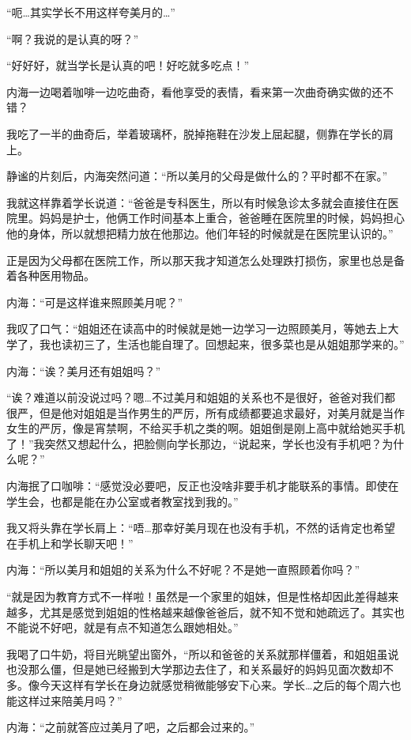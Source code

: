 “呃…其实学长不用这样夸美月的…”

“啊？我说的是认真的呀？”

“好好好，就当学长是认真的吧！好吃就多吃点！”

内海一边喝着咖啡一边吃曲奇，看他享受的表情，看来第一次曲奇确实做的还不错？

我吃了一半的曲奇后，举着玻璃杯，脱掉拖鞋在沙发上屈起腿，侧靠在学长的肩上。

静谧的片刻后，内海突然问道：“所以美月的父母是做什么的？平时都不在家。”

我就这样靠着学长说道：“爸爸是专科医生，所以有时候急诊太多就会直接住在医院里。妈妈是护士，他俩工作时间基本上重合，爸爸睡在医院里的时候，妈妈担心他的身体，所以就想把精力放在他那边。他们年轻的时候就是在医院里认识的。”

正是因为父母都在医院工作，所以那天我才知道怎么处理跌打损伤，家里也总是备着各种医用物品。

内海：“可是这样谁来照顾美月呢？”

我叹了口气：“姐姐还在读高中的时候就是她一边学习一边照顾美月，等她去上大学了，我也读初三了，生活也能自理了。回想起来，很多菜也是从姐姐那学来的。”

内海：“诶？美月还有姐姐吗？”

“诶？难道以前没说过吗？嗯…不过美月和姐姐的关系也不是很好，爸爸对我们都很严，但是他对姐姐是当作男生的严厉，所有成绩都要追求最好，对美月就是当作女生的严厉，像是宵禁啊，不给买手机之类的啊。姐姐倒是刚上高中就给她买手机了！”我突然又想起什么，把脸侧向学长那边，“说起来，学长也没有手机吧？为什么呢？”

内海抿了口咖啡：“感觉没必要吧，反正也没啥非要手机才能联系的事情。即使在学生会，也都是能在办公室或者教室找到我的。”

我又将头靠在学长肩上：“唔…那幸好美月现在也没有手机，不然的话肯定也希望在手机上和学长聊天吧！”

内海：“所以美月和姐姐的关系为什么不好呢？不是她一直照顾着你吗？”

“就是因为教育方式不一样啦！虽然是一个家里的姐妹，但是性格却因此差得越来越多，尤其是感觉到姐姐的性格越来越像爸爸后，就不知不觉和她疏远了。其实也不能说不好吧，就是有点不知道怎么跟她相处。”

我喝了口牛奶，将目光眺望出窗外，“所以和爸爸的关系就那样僵着，和姐姐虽说也没那么僵，但是她已经搬到大学那边去住了，和关系最好的妈妈见面次数却不多。像今天这样有学长在身边就感觉稍微能够安下心来。学长…之后的每个周六也能这样过来陪美月吗？”

内海：“之前就答应过美月了吧，之后都会过来的。”

